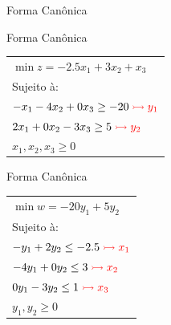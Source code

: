 \documentclass{beamer}
\begin{document}
\begin{frame}
\begin{columns}
\begin{column}{6cm}
{\begin{exampleblock}{Forma Canônica}
				\end{exampleblock}
			}		
			{
				\begin{exampleblock}{Forma Canônica}
					\begin{table}
						\begin{tabular}{l}
							$ \min z = -2.5x_1 + 3x_2 + x_3$ \\
							Sujeito à: \\
							$-x_1 - 4x_2 + 0x_3 \ge -20 \color{red} \rightarrowtail y_1$ \\
							$2x_1 + 0x_2 - 3x_3 \ge 5   \color{red} \rightarrowtail y_2$ \\
							$x_1, x_2, x_3 \ge 0$ \\
						\end{tabular}
					\end{table}
				\end{exampleblock}
			}		
			{
				\begin{alertblock}{Forma Canônica}
					\begin{table}
						\begin{tabular}{l}
							$ \min w = -20y_1 + 5y_2$ \\
							Sujeito à: \\
							$-y_1 + 2y_2 \le -2.5 		\color{red} \rightarrowtail x_1$ \\
							$-4y_1 + 0y_2 \le 3   		\color{red} \rightarrowtail x_2$ \\
							$0y_1 - 3y_2 \le 1			\color{red} \rightarrowtail x_3$ \\
							$y_1, y_2 \ge 0$ \\
						\end{tabular}
					\end{table}
				\end{alertblock}
			}		
		\end{column}		
	\end{columns}
\end{frame}
\end{document}
